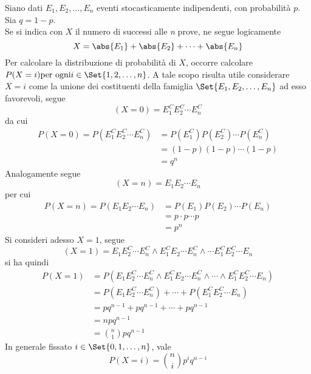 \documentclass{subfiles}
\begin{document}
Siano dati \(E_{1}, E_{2}, \dots, E_{n}\) eventi stocasticamente indipendenti, con probabilità \(p\). Sia \(q = 1 - p\).\\
Se si indica con \(X\) il numero di successi alle \emph{n} prove, ne segue logicamente
\[
    X = \abs{E_{1}} + \abs{E_{2}} + \cdots + \abs{E_{n}}
\]
Per calcolare la distribuzione di probabilità di \(X\), occorre calcolare \(P(X = i) \text{per ogni} i \in \Set{1, 2, \dots, n}\).
A tale scopo risulta utile considerare \(X = i\) come la unione dei costituenti della famiglia \(\Set{E_{1}, E_{2}, \dots, E_{n}}\) ad esso favorevoli, segue
\[
    (X = 0) = E_{1}^{C}E_{2}^{C}\cdots E_{n}^{C}
\]
da cui
\[\begin{aligned}
        P(X = 0) = P(E_{1}^{C}E_{2}^{C}\cdots E_{n}^{C}) & = P(E_{1}^{C})P(E_{2}^{C})\cdots P(E_{n}^{C}) \\
                                                         & = (1 - p)(1- p)\cdots (1 - p)                 \\
                                                         & = q^{n}
    \end{aligned}\]
Analogamente segue
\[
    (X = n) = E_{1}E_{2} \cdots E_{n}
\]
per cui
\[\begin{aligned}
        P(X = n) = P(E_{1}E_{2} \cdots E_{n}) & = P(E_{1})P(E_{2})\cdots P(E_{n}) \\
                                              & = p \cdot p \cdots p              \\
                                              & = p^{n}
    \end{aligned}\]
Si consideri adesso \(X = 1\), segue
\[
    (X = 1) = E_{1}E_{2}^{C}\cdots E_{n}^{C} \land E_{1}^{C}E_{2} \cdots E_{n}^{C} \land \cdots E_{1}^{C}E_{2}^{C}\cdots E_{n}
\]
si ha quindi
\[\begin{aligned}
        P(X = 1) & = P(E_{1}E_{2}^{C}\cdots E_{n}^{C} \land E_{1}^{C}E_{2}\cdots E_{n}^{C} \land \cdots \land E_{1}^{C}E_{2}^{C}\cdots E_{n}) \\
                 & = P(E_{1}E_{2}^{C}\cdots E_{n}^{C}) + \cdots + P(E_{1}^{C}E_{2}^{C}\cdots E_{n})                                           \\
                 & = pq^{n - 1} + pq^{n - 1} + \cdots + pq^{n - 1}                                                                            \\
                 & = npq^{n - 1}                                                                                                              \\
                 & = \binom{n}{1}pq^{n - 1}
    \end{aligned}\]
In generale fissato \(i \in \Set{0, 1, \dots, n}\), vale
\begin{equation}
    P(X = i) = \binom{n}{i}p^{i}q^{n - i}
\end{equation}
\end{document}
